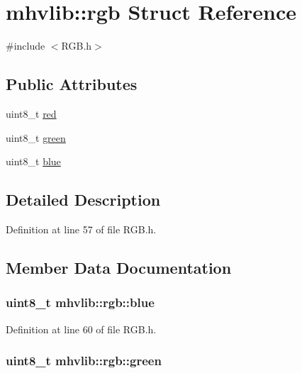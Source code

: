 \hypertarget{structmhvlib_1_1rgb}{\section{mhvlib\-:\-:rgb Struct Reference}
\label{structmhvlib_1_1rgb}
}


{\ttfamily \#include $<$R\-G\-B.\-h$>$}

\subsection*{Public Attributes}
\begin{DoxyCompactItemize}
\item 
uint8\-\_\-t \hyperlink{structmhvlib_1_1rgb_a1c8fd700cae854135cf12271347eabbf}{red}
\item 
uint8\-\_\-t \hyperlink{structmhvlib_1_1rgb_af41d852a90a300f8aece8ef1fcfc4aca}{green}
\item 
uint8\-\_\-t \hyperlink{structmhvlib_1_1rgb_a685f5cf4a86ac67caaea790ce626c869}{blue}
\end{DoxyCompactItemize}


\subsection{Detailed Description}


Definition at line 57 of file R\-G\-B.\-h.



\subsection{Member Data Documentation}
\hypertarget{structmhvlib_1_1rgb_a685f5cf4a86ac67caaea790ce626c869}{
\subsubsection[{blue}]{\setlength{\rightskip}{0pt plus 5cm}uint8\-\_\-t mhvlib\-::rgb\-::blue}}\label{structmhvlib_1_1rgb_a685f5cf4a86ac67caaea790ce626c869}


Definition at line 60 of file R\-G\-B.\-h.

\hypertarget{structmhvlib_1_1rgb_af41d852a90a300f8aece8ef1fcfc4aca}{
\subsubsection[{green}]{\setlength{\rightskip}{0pt plus 5cm}uint8\-\_\-t mhvlib\-::rgb\-::green}}\label{structmhvlib_1_1rgb_af41d852a90a300f8aece8ef1fcfc4aca}


